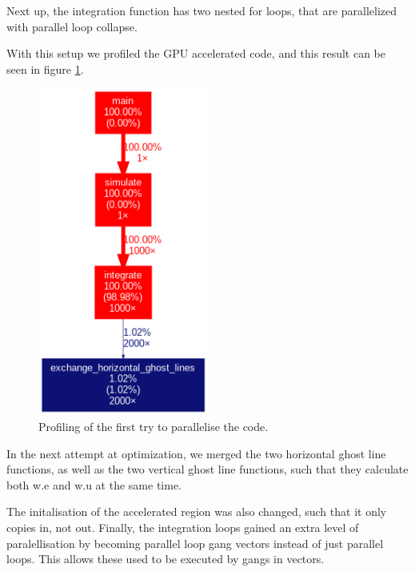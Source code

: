 \documentclass{article}
\begin{document}
Next up, the integration function has two nested for loops, that are parallelized with parallel loop collapse.

With this setup we profiled the GPU accelerated code, and this result can be seen in figure \ref{fig:profiling:firstattempt}.
\begin{figure}[h]
    \includegraphics[width=0.5\textwidth]{./figures/sequential_profile.png}
    \centering
    \caption{Profiling of the first try to parallelise the code. }
    \label{fig:profiling:firstattempt}
\end{figure}

In the next attempt at optimization, we merged the two horizontal ghost line functions, as well as the two vertical ghost line functions, such that they calculate both w.e and w.u at the same time.

The initalisation of the accelerated region was also changed, such that it only copies in, not out. Finally, the integration loops gained an extra level of paralellisation by becoming parallel loop gang vectors instead of just parallel loops. This allows these used to be executed by gangs in vectors.
\end{document}
